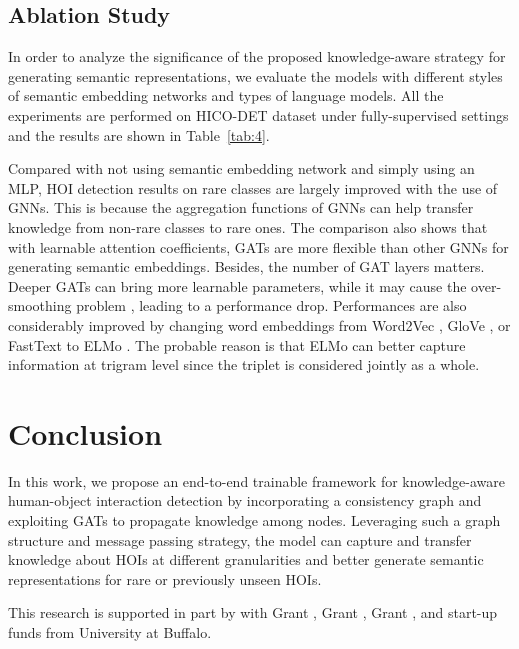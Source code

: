 \documentclass[sigconf,screen]{acmart}
\begin{document}
\subsection{Ablation Study}

In order to analyze the significance of the proposed knowledge-aware strategy for generating semantic representations, we evaluate the models with different styles of semantic embedding networks and types of language models. All the experiments are performed on HICO-DET dataset under fully-supervised settings and the results are shown in Table~\ref{tab:4}.

Compared with not using semantic embedding network and simply using an MLP, HOI detection results on rare classes are largely improved with the use of GNNs. This is because the aggregation functions of GNNs can help transfer knowledge from non-rare classes to rare ones. The comparison also shows that with learnable attention coefficients, GATs are more flexible than other GNNs for generating semantic embeddings. Besides, the number of GAT layers matters. Deeper GATs can bring more learnable parameters, while it may cause the over-smoothing problem \cite{li2019deepgcns}, leading to a performance drop. Performances are also considerably improved by changing word embeddings from Word2Vec \cite{mikolov2013efficient}, GloVe \cite{pennington2014glove}, or FastText \cite{joulin2016bag} to ELMo \cite{peters2018deep}. The probable reason is that ELMo can better capture information at trigram level since the triplet is considered jointly as a whole.

\section{Conclusion}

In this work, we propose an end-to-end trainable framework for knowledge-aware human-object interaction detection by incorporating a consistency graph and exploiting GATs to propagate knowledge among nodes. Leveraging such a graph structure and message passing strategy, the model can capture and transfer knowledge about HOIs at different granularities and better generate semantic representations for rare or previously unseen HOIs.

\begin{acks}

This research is supported in part by  with Grant ,  Grant ,  Grant , and start-up funds from University at Buffalo.

\end{acks}



\end{document}
